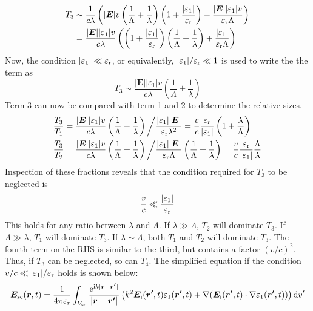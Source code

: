 \documentclass[11pt,twoside]{eitExjobb}
\begin{document}
	\begin{equation*}
	\begin{split}
		T_3 &\sim \frac{1}{c\lambda} \left( |\bm{E}| v \left( \frac{1}{\Lambda} + \frac{1}{\lambda} \right) \left( 1 + \frac{|\varepsilon_1|}{\varepsilon_{\mathrm{r}}} \right) + \frac{|\bm{E}| |\varepsilon_1| v}{\varepsilon_{\mathrm{r}} \Lambda} \right) \\
		&= \frac{|\bm{E}| |\varepsilon_1| v}{c\lambda} \left( \left( 1 + \frac{|\varepsilon_1|}{\varepsilon_{\mathrm{r}}} \right) \left( \frac{1}{\Lambda} + \frac{1}{\lambda} \right) + \frac{|\varepsilon_1|}{\varepsilon_{\mathrm{r}} \Lambda} \right)
	\end{split}
	\end{equation*}
	Now, the condition $|\varepsilon_1| \ll \varepsilon_{\mathrm{r}}$, or equivalently, $|\varepsilon_1|/\varepsilon_{\mathrm{r}} \ll 1$ is used to write the the term as
	\begin{equation*}
		T_3 \sim \frac{|\bm{E}| |\varepsilon_1| v}{c\lambda} \left( \frac{1}{\Lambda} + \frac{1}{\lambda} \right)
	\end{equation*}
	Term 3 can now be compared with term 1 and 2 to determine the relative sizes.
	\begin{align*}
		\frac{T_3}{T_1} &= \frac{|\bm{E}| |\varepsilon_1| v}{c\lambda} \left( \frac{1}{\Lambda} + \frac{1}{\lambda} \right)
		\bigg/
		\frac{|\varepsilon_1| |\bm{E}|}{\varepsilon_{\mathrm{r}} \lambda^2} =
		\frac{v}{c} \frac{\varepsilon_{\mathrm{r}}}{|\varepsilon_1|} \left( 1 + \frac{\lambda}{\Lambda} \right) \\
		\frac{T_3}{T_2} &= \frac{|\bm{E}| |\varepsilon_1| v}{c\lambda} \left( \frac{1}{\Lambda} + \frac{1}{\lambda} \right)
		\bigg/
		\frac{|\varepsilon_1| |\bm{E}|}{\varepsilon_{\mathrm{r}} \Lambda} \left( \frac{1}{\Lambda} + \frac{1}{\lambda} \right) =
		\frac{v}{c} \frac{\varepsilon_{\mathrm{r}}}{|\varepsilon_1|} \frac{\Lambda}{\lambda}
	\end{align*}
	Inspection of these fractions reveals that the condition required for $T_3$ to be neglected is
	\begin{equation*}
		\frac{v}{c} \ll \frac{|\varepsilon_1|}{\varepsilon_{\mathrm{r}}}
	\end{equation*}
	This holds for any ratio between $\lambda$ and $\Lambda$. If $\lambda \gg \Lambda$, $T_2$ will dominate $T_3$. If $\Lambda \gg \lambda$, $T_1$ will dominate $T_3$. If $\lambda \sim \Lambda$, both $T_1$ and $T_2$ will dominate $T_3$. The fourth term on the RHS is similar to the third, but contains a factor $(v/c)^2$. Thus, if $T_3$ can be neglected, so can $T_4$.	The simplified equation if the condition $v/c \ll |\varepsilon_1|/\varepsilon_{\mathrm{r}}$ holds is shown below:
	\begin{equation*}
		\bm{E}_{\mathrm{sc}}(\bm{r},t) = \frac{1}{4\pi\varepsilon_{\mathrm{r}}} \int_{V_{\mathrm{sc}}} \frac{\mathrm{e}^{\mathrm{i} k |\bm{r}-\bm{r'}| }}{ |\bm{r}-\bm{r'}|} \left( k^2 \bm{E}_{\mathrm{i}} (\bm{r'},t) \varepsilon_1 (\bm{r'},t) + \nabla (\bm{E}_{\mathrm{i}} (\bm{r'},t) \cdot \nabla \varepsilon_1 (\bm{r'},t)) \right) \mathrm{d}v'
	\end{equation*}
	
\end{document}
